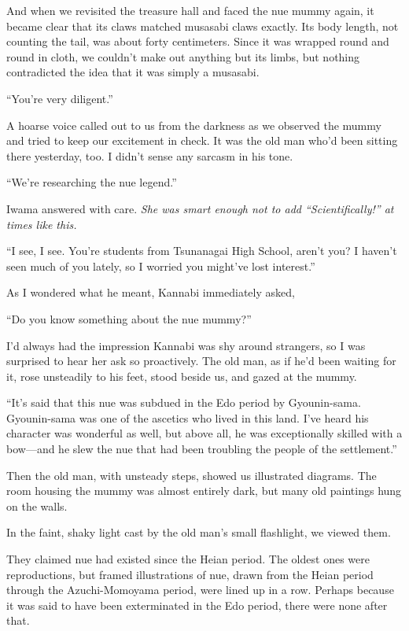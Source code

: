 \documentclass[
    a4paper,
    12pt,
    twoside,
    openany,
    UTF8,
    fontset=windows
]{ctexbook}
\begin{document}
And when we revisited the treasure hall and faced the nue mummy again, it became clear that its claws matched musasabi claws exactly. Its body length, not counting the tail, was about forty centimeters. Since it was wrapped round and round in cloth, we couldn't make out anything but its limbs, but nothing contradicted the idea that it was simply a musasabi.

``You're very diligent.''

A hoarse voice called out to us from the darkness as we observed the mummy and tried to keep our excitement in check. It was the old man who'd been sitting there yesterday, too. I didn't sense any sarcasm in his tone.

``We're researching the nue legend.''

Iwama answered with care. \textit{She was smart enough not to add ``Scientifically!'' at times like this.}

``I see, I see. You're students from Tsunanagai High School, aren't you? I haven't seen much of you lately, so I worried you might've lost interest.''

As I wondered what he meant, Kannabi immediately asked,

``Do you know something about the nue mummy?''

I'd always had the impression Kannabi was shy around strangers, so I was surprised to hear her ask so proactively. The old man, as if he'd been waiting for it, rose unsteadily to his feet, stood beside us, and gazed at the mummy.

``It's said that this nue was subdued in the Edo period by Gyounin-sama. Gyounin-sama was one of the ascetics who lived in this land. I've heard his character was wonderful as well, but above all, he was exceptionally skilled with a bow---and he slew the nue that had been troubling the people of the settlement.''

Then the old man, with unsteady steps, showed us illustrated diagrams. The room housing the mummy was almost entirely dark, but many old paintings hung on the walls.

In the faint, shaky light cast by the old man's small flashlight, we viewed them.

They claimed nue had existed since the Heian period. The oldest ones were reproductions, but framed illustrations of nue, drawn from the Heian period through the Azuchi-Momoyama period, were lined up in a row. Perhaps because it was said to have been exterminated in the Edo period, there were none after that.
\end{document}
